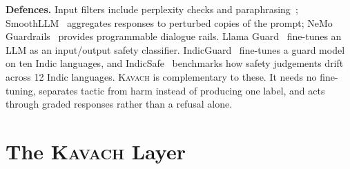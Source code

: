 \documentclass[conference]{IEEEtran}
\begin{document}
\textbf{Defences.} Input filters include perplexity checks and paraphrasing~\cite{jain2023baseline}; SmoothLLM~\cite{robey2023smoothllm} aggregates responses to perturbed copies of the prompt; NeMo Guardrails~\cite{rebedea2023nemo} provides programmable dialogue rails. Llama Guard~\cite{inan2023llamaguard} fine-tunes an LLM as an input/output safety classifier. IndicGuard~\cite{bramhecha2026indicguard} fine-tunes a guard model on ten Indic languages, and IndicSafe~\cite{pattnayak2026indicsafe} benchmarks how safety judgements drift across 12 Indic languages. \textsc{Kavach} is complementary to these. It needs no fine-tuning, separates tactic from harm instead of producing one label, and acts through graded responses rather than a refusal alone.

\section{The \textsc{Kavach} Layer}
\end{document}
